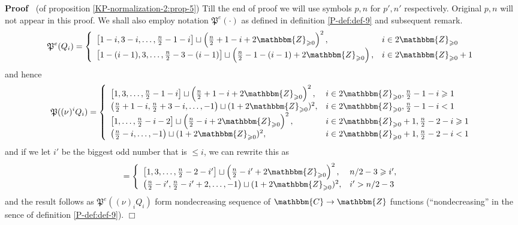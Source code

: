 \documentclass{article}
\newenvironment{proof}{\noindent\textbf{Proof\ }}{\hspace*{\fill}$\Box$\medskip}
\numberwithin{definition}{section}
\numberwithin{lemma}{section}
\numberwithin{proposition}{section}
{\theorembodyfont{\rmfamily}\newtheorem{remark}{Remark}
\numberwithin{remark}{section}
}
\begin{document}
\begin{proof}
  (of proposition \ref{KP-normalization-2:prop-5}) Till the end of proof we
  will use symbols $p, n$ for $p', n'$ respectively. Original $p, n$ will not
  appear in this proof. We shall also employ notation $\mathfrak{P}^e (
  \cdot)$ as defined in definition \ref{P-def:def-9} and subsequent remark.
  \[ \mathfrak{P}^e ( Q_i) = \left\{ \begin{array}{ll}
       \left[ 1 - i, 3 - i, \ldots, \frac{n}{2} - 1 - i \right] \sqcup \left(
       \frac{n}{2} + 1 - i + 2\mathbbm{Z}_{\geqslant 0} \right)^2, & i \in
       2\mathbbm{Z}_{\geqslant 0}\\
       \left[ 1 - ( i - 1), 3, \ldots, \frac{n}{2} - 3 - ( i - 1) \right]
       \sqcup \left( \frac{n}{2} - 1 - ( i - 1) + 2\mathbbm{Z}_{\geqslant 0}
       \right), & i \in 2\mathbbm{Z}_{\geqslant 0} + 1
     \end{array} \right. \]
  and hence
  \[ \mathfrak{P} ( ( \nu^{})^i Q_i) = \left\{ \begin{array}{ll}
       \left[ 1, 3, \ldots, \frac{n}{2} - 1 - i \right] \sqcup \left(
       \frac{n}{2} + 1 - i + 2\mathbbm{Z}_{\geqslant 0} \right)^2, & i \in
       2\mathbbm{Z}_{\geqslant 0}, \frac{n}{2} - 1 - i \geqslant 1\\
       \left( \frac{n}{2} + 1 - i, \frac{n}{2} + 3 - i, \ldots, - 1 \right)
       \sqcup ( 1 + 2\mathbbm{Z}_{\geqslant 0})^2, & i \in
       2\mathbbm{Z}_{\geqslant 0}, \frac{n}{2} - 1 - i < 1\\
       \left[ 1, \ldots, \frac{n}{2} - i - 2 \right] \sqcup \left( \frac{n}{2}
       - i + 2\mathbbm{Z}_{\geqslant 0} \right)^2, & i \in
       2\mathbbm{Z}_{\geqslant 0} + 1, \frac{n}{2} - 2 - i \geqslant 1\\
       \left( \frac{n}{2} - i, \ldots, - 1 \right) \sqcup ( 1 +
       2\mathbbm{Z}_{\geqslant 0})^2, & i \in 2\mathbbm{Z}_{\geqslant 0} + 1,
       \frac{n}{2} - 2 - i < 1
     \end{array} \right. \]
  and if we let $i'$ be the biggest odd number that is $\leqslant i$, we can
  rewrite this as
  \[ = \left\{ \begin{array}{ll}
       \left[ 1, 3, \ldots, \frac{n}{2} - 2 - i' \right] \sqcup \left(
       \frac{n}{2} - i' + 2\mathbbm{Z}_{\geqslant 0} \right)^2, & n / 2 - 3
       \geqslant i',\\
       \left( \frac{n}{2} - i', \frac{n}{2} - i' + 2, \ldots, - 1 \right)
       \sqcup ( 1 + 2\mathbbm{Z}_{\geqslant 0})^2, & i' > n / 2 - 3
     \end{array} \right. \]
  and the result follows as $\mathfrak{P}^e ( ( \nu)^{}_i Q_i)$ form
  nondecreasing sequence of $\mathbbm{C} \rightarrow \mathbbm{Z}$ functions
  (``nondecreasing'' in the sence of definition \ref{P-def:def-9}).
\end{proof}
\end{document}

